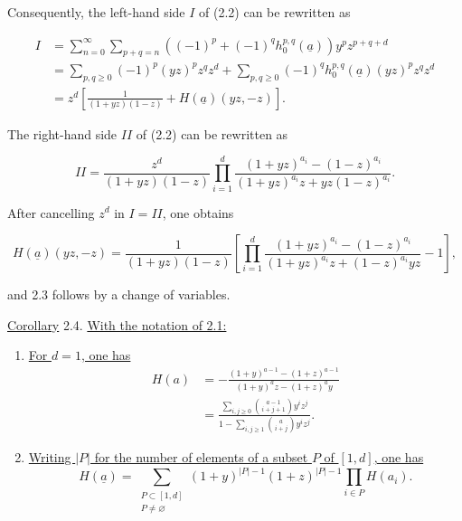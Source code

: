 Consequently, the left-hand side $I$ of (2.2) can be rewritten as

\begin{align*}
I
&=\sum_{n=0}^{\infty}\sum_{p+q=n}
\left((-1)^p+(-1)^q h_0^{p,q}(\underline a)\right)y^pz^{p+q+d}\\
&=\sum_{p,q\geq0}(-1)^p(yz)^pz^qz^d
+\sum_{p,q\geq0}(-1)^q h_0^{p,q}(\underline a)(yz)^pz^qz^d\\
&=z^d\left[\frac{1}{(1+yz)(1-z)}
+H(\underline a)(yz,-z)\right].
\end{align*}

The right-hand side $II$ of (2.2) can be rewritten as

\begin{equation*}
II=\frac{z^d}{(1+yz)(1-z)}
\prod_{i=1}^d
\frac{(1+yz)^{a_i}-(1-z)^{a_i}}
{(1+yz)^{a_i}z+yz(1-z)^{a_i}}.
\end{equation*}

After cancelling $z^d$ in $I=II$, one obtains

\begin{equation*}
H(\underline a)(yz,-z)
=\frac{1}{(1+yz)(1-z)}\left[
\prod_{i=1}^d
\frac{(1+yz)^{a_i}-(1-z)^{a_i}}
{(1+yz)^{a_i}z+(1-z)^{a_i}yz}-1\right],
\end{equation*}

and 2.3 follows by a change of variables.


\underline{Corollary} 2.4. \underline{With the notation of 2.1:}

\begin{enumerate}[label=(\roman*),leftmargin=2.6em]
\item \underline{For $d=1$, one has}
\begin{equation*}
\begin{aligned}
H(a)
&=-\frac{(1+y)^{a-1}-(1+z)^{a-1}}
{(1+y)^az-(1+z)^ay}\\[1ex]
&=\frac{\displaystyle\sum_{i,j\geq0}
\binom{a-1}{i+j+1}y^iz^j}
{\displaystyle1-\sum_{i,j\geq1}\binom{a}{i+j}y^iz^j}.
\end{aligned}
\end{equation*}

\item \underline{Writing $|P|$ for the number of elements of a subset
$P$ of $[1,d]$, one has}
\begin{equation*}
H(\underline a)=
\sum_{\substack{P\subset[1,d]\\P\ne\varnothing}}
(1+y)^{|P|-1}(1+z)^{|P|-1}
\prod_{i\in P}H(a_i).
\end{equation*}
\end{enumerate}

